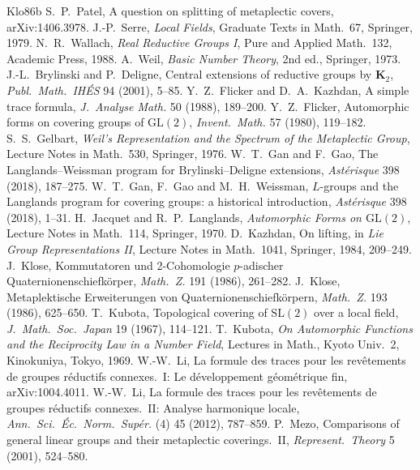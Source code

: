 \documentclass[12pt]{article}
\newcommand{\GL}{\mathrm{GL}}
\newcommand{\SL}{\mathrm{SL}}
\theoremstyle{plain}
\theoremstyle{definition}
\begin{document}
\begin{thebibliography}{Klo86b}
 S.~P.~Patel, A question on splitting of metaplectic covers, arXiv:1406.3978.
 J.-P.~Serre, \emph{Local Fields}, Graduate Texts in Math.\ 67, Springer, 1979.
 N.~R.~Wallach, \emph{Real Reductive Groups I}, Pure and Applied Math.\ 132, Academic Press, 1988.
 A.~Weil, \emph{Basic Number Theory}, 2nd ed., Springer, 1973.
 J.-L.~Brylinski and P.~Deligne, Central extensions of reductive groups by $\mathbf K_2$, \emph{Publ.\ Math.\ IH\'ES} 94 (2001), 5--85.
 Y.~Z.~Flicker and D.~A.~Kazhdan, A simple trace formula, \emph{J.\ Analyse Math.} 50 (1988), 189--200.
 Y.~Z.~Flicker, Automorphic forms on covering groups of $\GL(2)$, \emph{Invent.\ Math.} 57 (1980), 119--182.
 S.~S.~Gelbart, \emph{Weil's Representation and the Spectrum of the Metaplectic Group}, Lecture Notes in Math.\ 530, Springer, 1976.
 W.~T.~Gan and F.~Gao, The Langlands--Weissman program for Brylinski--Deligne extensions, \emph{Ast\'erisque} 398 (2018), 187--275.
 W.~T.~Gan, F.~Gao and M.~H.~Weissman, $L$-groups and the Langlands program for covering groups: a historical introduction, \emph{Ast\'erisque} 398 (2018), 1--31.
 H.~Jacquet and R.~P.~Langlands, \emph{Automorphic Forms on $\GL(2)$}, Lecture Notes in Math.\ 114, Springer, 1970.
 D.~Kazhdan, On lifting, in \emph{Lie Group Representations II}, Lecture Notes in Math.\ 1041, Springer, 1984, 209--249.
 J.~Klose, Kommutatoren und 2-Cohomologie $p$-adischer Quaternionenschiefk\"orper, \emph{Math.\ Z.} 191 (1986), 261--282.
 J.~Klose, Metaplektische Erweiterungen von Quaternionenschiefk\"orpern, \emph{Math.\ Z.} 193 (1986), 625--650.
 T.~Kubota, Topological covering of $\SL(2)$ over a local field, \emph{J.\ Math.\ Soc.\ Japan} 19 (1967), 114--121.
 T.~Kubota, \emph{On Automorphic Functions and the Reciprocity Law in a Number Field}, Lectures in Math., Kyoto Univ.\ 2, Kinokuniya, Tokyo, 1969.
 W.-W.~Li, La formule des traces pour les rev\^etements de groupes r\'eductifs connexes.\ I: Le d\'eveloppement g\'eom\'etrique fin, arXiv:1004.4011.
 W.-W.~Li, La formule des traces pour les rev\^etements de groupes r\'eductifs connexes.\ II: Analyse harmonique locale, \emph{Ann.\ Sci.\ \'Ec.\ Norm.\ Sup\'er.} (4) 45 (2012), 787--859.
 P.~Mezo, Comparisons of general linear groups and their metaplectic coverings.\ II, \emph{Represent.\ Theory} 5 (2001), 524--580.

\end{thebibliography}
\end{document}
